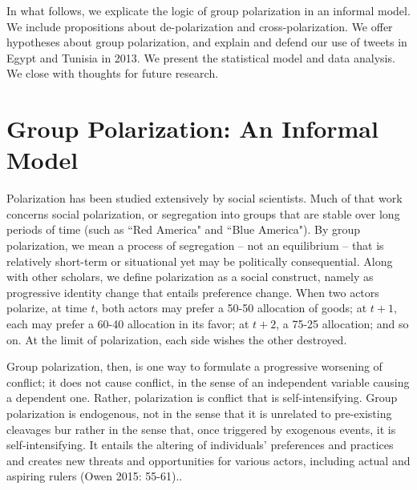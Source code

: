 \documentclass[12pt]{article}
\begin{document}
In what follows, we explicate the logic of group polarization in an informal model.  We include propositions about de-polarization and cross-polarization.  We offer hypotheses about group polarization, and explain and defend our use of tweets in Egypt and Tunisia in 2013.  We present the statistical model and data analysis.  We close with thoughts for future research.


\section*{Group Polarization: An Informal Model}
Polarization has been studied extensively by social scientists.  Much of that work concerns social polarization, or segregation into groups that are stable over long periods of time (such as ``Red America" and ``Blue America").   By group polarization, we mean a process of segregation – not an equilibrium – that is relatively short-term or situational yet may be politically consequential.   Along with other scholars, we define polarization as a social construct, namely as progressive identity change that entails preference change.   When two actors polarize, at time $t$, both actors may prefer a 50-50 allocation of goods; at $t+1$, each may prefer a 60-40 allocation in its favor; at $t+2$, a 75-25 allocation; and so on.  At the limit of polarization, each side wishes the other destroyed.   

Group polarization, then, is one way to formulate a progressive worsening of conflict; it does not cause conflict, in the sense of an independent variable causing a dependent one.  Rather, polarization is conflict that is self-intensifying.  Group polarization is endogenous, not in the sense that it is unrelated to pre-existing cleavages bur rather in the sense that, once triggered by exogenous events, it is self-intensifying.   It entails the altering of individuals' preferences and practices and creates new threats and opportunities for various actors, including actual and aspiring rulers (Owen 2015: 55-61)..  
\end{document}
